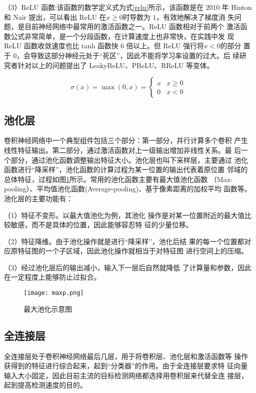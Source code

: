 （3）ReLU 函数:该函数的数学定义式为式\ref{relu}所示，该函数是在 2010 年
Hinton 和 Nair 提出，可以看出 ReLU 在$x\ge 0$时导数为 $1$，有效地解决了梯度消
失问题，是目前神经网络中最常用的激活函数之一\cite{xu2015empirical}。ReLU 函数相对于前两个
激活函数公式非常简单，是一个分段函数，在计算速度上也非常快，在实践中发
现 ReLU 函数收敛速度也比 tanh 函数快 6 倍以上。但 ReLU 强行将$ x<0$的部分
置于 0，会导致这部分神经元处于“死区”，因此不能将学习率设置的过大。后
续研究者针对以上的问题提出了 LeakyReLU\cite{maas2013rectifier}、PReLU、RReLU 等变体。

\begin{equation}
    \sigma(x)=\max (0, x)= \begin{cases}x & x \geq 0 \\ 0 & x<0\end{cases}
    \label{relu}
\end{equation}

\subsection{池化层}
卷积神经网络中一个典型组件包括三个部分：第一部分，并行计算多个卷积
产生线性特征输出。第二部分，通过激活函数对上一级输出增加非线性关系。最
后一个部分，通过池化函数调整输出特征大小。池化层也叫下采样层，主要通过
池化函数进行“降采样”，池化函数的计算过程为某一位置的输出代表着原位置
邻域的总体特征\cite{樊峻畅2017红外图像中基于卷积神经网络的车辆检测}，过程如图\ref{maxp}所示。常用的池化函数主要有最大值池化函数
（Max-pooling）、平均值池化函数(Average-pooling)、基于像素距离的加权平均
函数等。池化层的主要功能有：

（1）特征不变形。以最大值池化为例，其池化
操作是对某一位置附近的最大值比较敏感，而不是具体的位置，因此能够容忍特
征的少量位移。

（2）特征降维。由于池化操作就是进行“降采样”，池化后结
果的每一个位置都对应原特征图的一个子区域，因此池化操作就相当于对特征图
进行空间上的压缩。

（3）经过池化层后的输出减小，输入下一层后自然就降低
了计算量和参数，因此在一定程度上能够防止过拟合\cite{gu2018recent}。

\begin{figure}[htbp]
    \centering
    \texttt{[image: maxp.png]}
    \caption{最大池化示意图}
    \label{maxp}
\end{figure}

\subsection{全连接层}
全连接层处于卷积神经网络最后几层，用于将卷积层、池化层和激活函数等
操作获得到的特征进行综合起来，起到“分类器”的作用。由于全连接层要求特
征向量输入大小固定，因此目前主流的目标检测网络都选择用卷积层来代替全连
接层，起到提高检测速度的目的。

